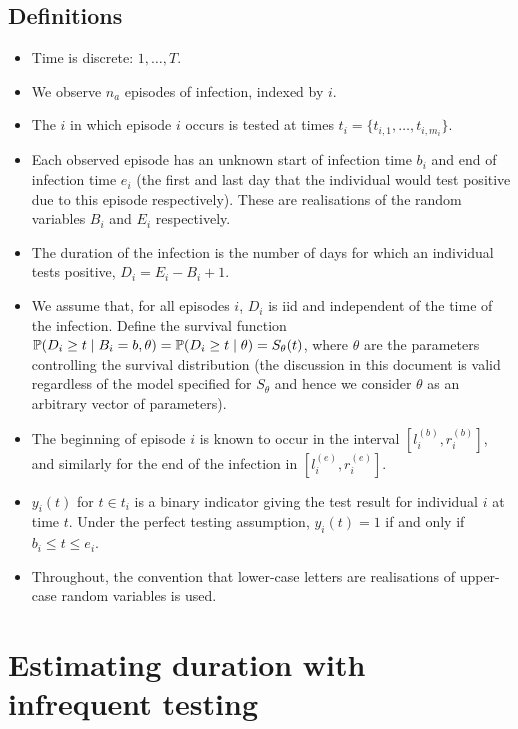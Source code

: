 \documentclass[thesis.tex]{subfiles}
\begin{document}
\section{Definitions}
\begin{itemize}
\item
  Time is discrete: $1, \dots, T$.
\item
  We observe $n_a$ episodes of infection, indexed by $i$.
\item
  The $i$ in which episode $i$ occurs is tested at times
  $t_i = \{ t_{i,1}, \dots, t_{i,m_i} \}$.
\item
  Each observed episode has an unknown start of infection time $b_i$
  and end of infection time $e_i$ (the first and last day that the
  individual would test positive due to this episode respectively).
  These are realisations of the random variables $B_i$ and $E_i$
  respectively.
\item
  The duration of the infection is the number of days for which an
  individual tests positive, $D_i = E_i - B_i + 1$.
\item
  We assume that, for all episodes $i$, $D_i$ is iid and independent
  of the time of the infection. Define the survival function
  $\operatorname{\mathbb{P}}(D_i \geq t \mid B_i = b, \theta) = \operatorname{\mathbb{P}}(D_i \geq t \mid \theta) = S_\theta(t)$,
  where $\theta$ are the parameters controlling the survival
  distribution (the discussion in this document is valid regardless of
  the model specified for $S_\theta$ and hence we consider $\theta$
  as an arbitrary vector of parameters).
\item
  The beginning of episode $i$ is known to occur in the interval
  $[l_i^{(b)}, r_i^{(b)}]$, and similarly for the end of the infection
  in $[l_i^{(e)}, r_i^{(e)}]$.
\item
  $y_i(t)$ for $t \in t_i$ is a binary indicator giving the test
  result for individual $i$ at time $t$. Under the perfect testing
  assumption, $y_i(t) = 1$ if and only if $b_i \leq t \leq e_i$.
\item
  Throughout, the convention that lower-case letters are realisations of
  upper-case random variables is used.
\end{itemize}

\chapter{Estimating duration with infrequent testing} \label{perf-test}
\end{document}
